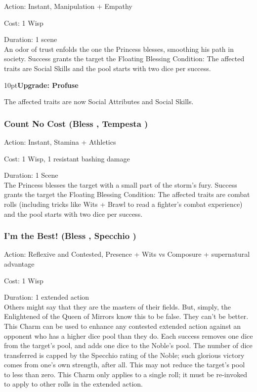\noindent Action: Instant, Manipulation + Empathy

\noindent Cost: 1 Wisp

\noindent Duration: 1 scene \\

\noindent An odor of trust enfolds the one the Princess blesses, smoothing his path in society. Success grants the target the Floating Blessing Condition: The affected traits are Social Skills and the pool starts with two dice per success. 

\begin{myindentpar}{10pt}\textbf{Upgrade: Profuse}

The affected traits are now Social Attributes and Social Skills.\end{myindentpar}

\subsubsection*{Count No Cost (Bless \textbullet, Tempesta \textbullet)}

\noindent Action: Instant, Stamina + Athletics

\noindent Cost: 1 Wisp, 1 resistant bashing damage

\noindent Duration: 1 Scene \\

\noindent The Princess blesses the target with a small part of the storm's fury. Success grants the target the Floating Blessing Condition: The affected traits are combat rolls (including tricks like Wits + Brawl to read a fighter's combat experience) and the pool starts with two dice per success. 

\subsubsection*{I'm the Best! (Bless \textbullet, Specchio \textbullet)}

\noindent Action: Reflexive and Contested, Presence + Wits vs Composure + supernatural advantage

\noindent Cost: 1 Wisp

\noindent Duration: 1 extended action\\

\noindent Others might say that they are the masters of their fields. But, simply, the Enlightened of the Queen of Mirrors know this to be false. They can't be better. This Charm can be used to enhance any contested extended action against an opponent who has a higher dice pool than they do. Each success removes one dice from the target's pool, and adds one dice to the Noble's pool. The number of dice transferred is capped by the Specchio rating of the Noble; such glorious victory comes from one's own strength, after all. This may not reduce the target's pool to less than zero. This Charm only applies to a single roll; it must be re-invoked to apply to other rolls in the extended action.


